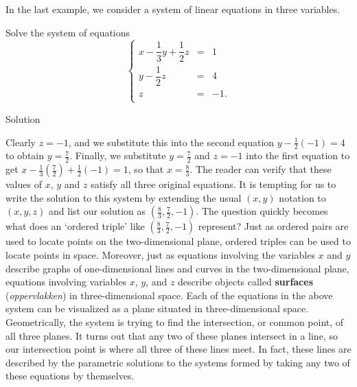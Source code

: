 \smallskip



%

In the last example, we consider a system of linear equations in three variables.


\begin{example} \label{syst_lin_eq_elimination_ex5} 
Solve the system of equations 
\[ \left\{ \begin{array}{rcl} x-\dfrac{1}{3}y+\dfrac{1}{2}z &=& 1 \\[0.4cm]
y - \dfrac{1}{2} z &=& 4 \\[0.4cm]
z &=& -1. \\ \end{array} \right.\]  

Solution 
	

Clearly $z = -1$, and we substitute this into the second equation $y - \frac{1}{2} (-1) = 4$ to obtain $y = \frac{7}{2}$.  Finally, we substitute $y = \frac{7}{2}$ and $z=-1$ into the first equation to get $x - \frac{1}{3}\left(\frac{7}{2}\right) + \frac{1}{2}(-1) = 1$, so that $x = \frac{8}{3}$.  The reader can verify that these values of $x$, $y$ and $z$ satisfy all three original equations.  It is tempting for us to write the solution to this system by extending the usual $(x,y)$ notation to $(x,y,z)$ and list our solution as $\left(\frac{8}{3},\frac{7}{2},-1\right)$.  The question quickly becomes what does an `ordered triple' like $\left(\frac{8}{3},\frac{7}{2},-1\right)$ represent?  Just as ordered pairs are used to locate points on the two-dimensional plane, ordered triples can be used to locate points in space. Moreover, just as equations involving the variables $x$ and $y$ describe graphs of one-dimensional lines and curves in the two-dimensional plane, equations involving variables $x$, $y$, and $z$ describe objects called \textbf{surfaces} (\textit{oppervlakken}) in three-dimensional space.  Each of the equations in the above system can be visualized as a plane situated in three-dimensional space.  Geometrically, the system is trying to find the intersection, or common point, of all three planes. It turns out that any two of these planes intersect in a line, so our intersection point is where all three of these lines meet. In fact, these lines are described by the parametric solutions to the systems formed by taking any two of these equations by themselves.


\end{example}
